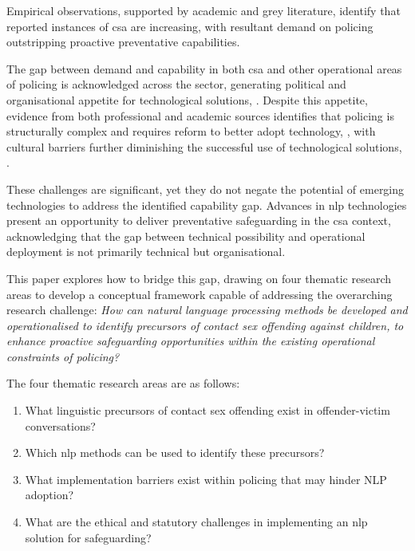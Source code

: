 \documentclass[12pt,a4paper,oneside]{report}
\begin{document}
Empirical observations, supported by academic and grey literature, \citep{finkelhor2024prevalence,CPAI2025} identify that reported instances of \gls{csa} are increasing, with resultant demand on policing outstripping proactive preventative capabilities.

The gap between demand and capability in both \gls{csa} and other operational areas of policing is acknowledged across the sector, generating political and organisational appetite for technological solutions, \citep{npcc2026policeai}.  Despite this appetite, evidence from both professional and academic sources identifies that policing is structurally complex and requires reform to better adopt technology, \citep{homeoffice2024reform}, with cultural barriers further diminishing the successful use of technological solutions, \citep{thompson2021missed,kassem2025their}.

These challenges are significant, yet they do not negate the potential of emerging technologies to address the identified capability gap.  Advances in \gls{nlp} technologies present an opportunity to deliver preventative safeguarding in the \gls{csa} context, acknowledging that the gap between technical possibility and operational deployment is not primarily technical but organisational.  

This paper explores how to bridge this gap, drawing on four thematic research areas to develop a conceptual framework capable of addressing the overarching research challenge: \textit{How can natural language processing methods be developed and operationalised to identify precursors of contact sex offending against children, to enhance proactive safeguarding opportunities within the existing operational constraints of policing?}

\newpage

The four thematic research areas are as follows: 

\begin{enumerate}
  \item What linguistic precursors of contact sex offending exist in offender-victim conversations?
  \item Which \gls{nlp} methods can be used to identify these precursors?
  \item What implementation barriers exist within policing that may hinder NLP adoption?
  \item What are the ethical and statutory challenges in implementing an \gls{nlp} solution for safeguarding?
\end{enumerate}
\end{document}
